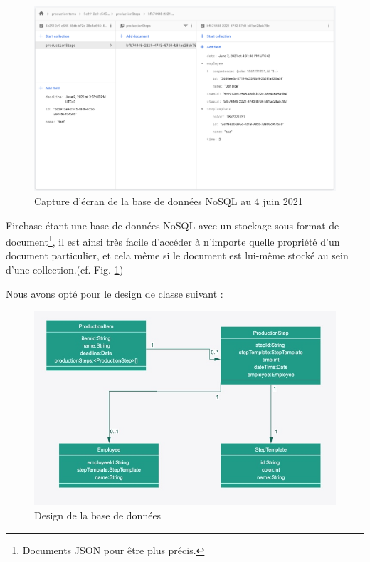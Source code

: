\begin{figure}[!h]
    \centering
    \includegraphics[scale=0.5]{img/screen_firebase2.png}
    \caption{Capture d'écran de la base de données NoSQL au 4 juin 2021}
    \label{fig:CaptureFirebase}
\end{figure}

Firebase étant une base de données NoSQL avec un stockage sous format de document\footnote{Documents JSON pour être plus précis.}, il est ainsi très facile d'accéder à n'importe quelle propriété d'un document particulier, et cela même si le document est lui-même stocké au sein d'une collection.(cf. Fig. \ref{fig:CaptureFirebase})

\clearpage
Nous avons opté pour le design de classe suivant : 

\begin{figure}[!h]
    \centering
    \includegraphics[scale=0.6]{img/class_diag.jpeg}
    \caption{Design de la base de données}
    \label{fig:diagClass}
\end{figure}

